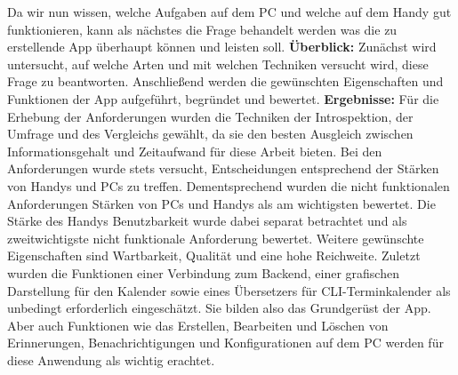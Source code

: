 	Da wir nun wissen, welche Aufgaben auf dem PC und welche auf dem Handy gut funktionieren, kann als nächstes die Frage behandelt werden \glqq was die zu erstellende App überhaupt können und leisten soll\grqq{}. %
\newline
\textbf{Überblick:}
	Zunächst wird untersucht, auf welche Arten und mit welchen Techniken versucht wird, diese Frage zu beantworten. %
	Anschließend werden die gewünschten Eigenschaften und Funktionen der App aufgeführt, begründet und bewertet.%
\newline
\textbf{Ergebnisse:} %
Für die Erhebung der Anforderungen wurden die Techniken der Introspektion, der Umfrage und des Vergleichs gewählt, da sie den besten Ausgleich zwischen Informationsgehalt und Zeitaufwand für diese Arbeit bieten. %
Bei den Anforderungen wurde stets versucht, Entscheidungen entsprechend der Stärken von Handys und PCs zu treffen. Dementsprechend wurden die nicht funktionalen Anforderungen \glqq Stärken von PCs und Handys\grqq{} als am wichtigsten bewertet. Die Stärke des Handys \glqq Benutzbarkeit\grqq{} wurde dabei separat betrachtet und als zweitwichtigste nicht funktionale Anforderung bewertet. Weitere gewünschte Eigenschaften sind \glqq Wartbarkeit\grqq{}, \glqq Qualität\grqq{} und eine hohe \glqq Reichweite\grqq{}.%
Zuletzt wurden die Funktionen einer \glqq Verbindung zum Backend\grqq{}, einer \glqq grafischen Darstellung für den Kalender\grqq{} sowie eines \glqq Übersetzers für CLI-Terminkalender\grqq{} als unbedingt erforderlich eingeschätzt. Sie bilden also das Grundgerüst der App. Aber auch Funktionen wie das \glqq Erstellen, Bearbeiten und Löschen von Erinnerungen\grqq{}, \glqq Benachrichtigungen\grqq{} und \glqq Konfigurationen auf dem PC\grqq{} werden für diese Anwendung als wichtig erachtet.
%
%
%
